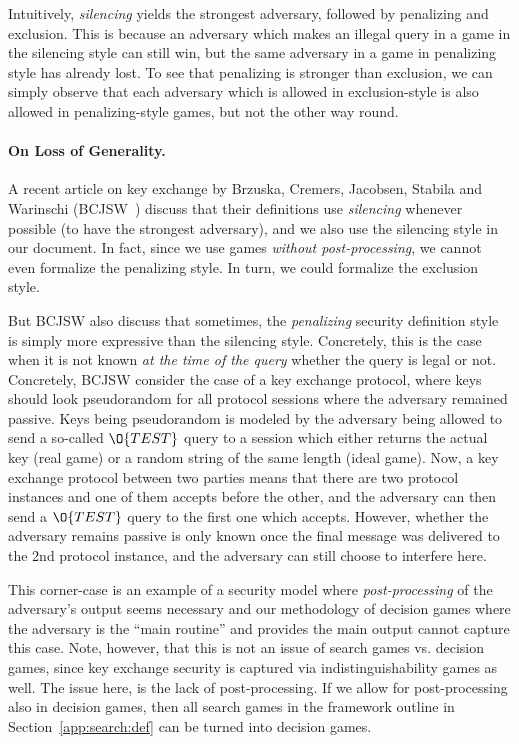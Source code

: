 Intuitively, \emph{silencing} yields the strongest adversary, followed by penalizing and exclusion. This is because an adversary which makes an illegal query in a game in the silencing style can still win, but the same adversary in a game in penalizing style has already lost. To see that penalizing is stronger than exclusion, we can simply observe that each adversary which is allowed in exclusion-style is also allowed in penalizing-style games, but not the other way round.

\paragraph{On Loss of Generality.} A recent article on key exchange by Brzuska, Cremers, Jacobsen, Stabila and Warinschi (BCJSW~\cite{BCJSW25}) discuss that their definitions use \emph{silencing} whenever possible (to have the strongest adversary), and we also use the silencing style in our document. In fact, since we use games \emph{without post-processing}, we cannot even formalize the penalizing style. In turn, we could formalize the exclusion style.

But BCJSW also discuss that sometimes, the \emph{penalizing} security definition style is simply more expressive than the silencing style. Concretely, this is the case when it is not known \emph{at the time of the query} whether the query is legal or not. Concretely, BCJSW consider the case of a key exchange protocol, where keys should look pseudorandom for all protocol sessions where the adversary remained passive. Keys being pseudorandom is modeled by the adversary being allowed to send a so-called $\O{TEST}$ query to a session which either returns the actual key (real game) or a random string of the same length (ideal game). Now, a key exchange protocol between two parties means that there are two protocol instances and one of them accepts before
the other, and the adversary can then send a $\O{TEST}$ query to the first one which accepts. However, whether the adversary remains passive is only known once the final message was delivered to the 2nd protocol instance, and the adversary can still choose to interfere here.

This corner-case is an example of a security model where \emph{post-processing} of the adversary's output seems necessary and our methodology of decision games where the adversary is the ``main routine'' and provides the main output cannot capture this case. Note, however, that this is not an issue of search games vs. decision games, since key exchange security is captured via indistinguishability games as well. The issue here, is the lack of post-processing. If we allow for post-processing also in decision games, then all search games in the framework outline in Section~\ref{app:search:def} can be turned into decision games.

